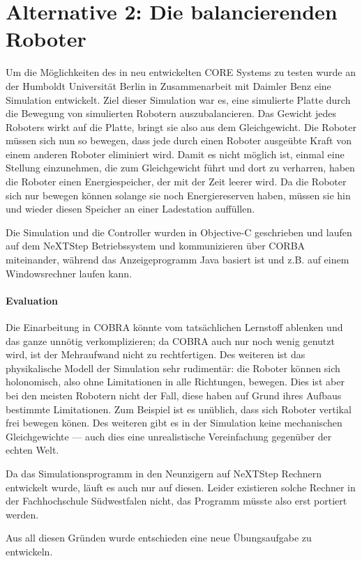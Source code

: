 \clearpage
\section{Alternative 2: Die balancierenden Roboter}
Um die M{\"{o}}glichkeiten des in \cite{Werner00} neu entwickelten CORE Systems zu testen wurde an der Humboldt Universit{\"{a}}t Berlin in Zusammenarbeit
mit Daimler Benz eine Simulation entwickelt. Ziel dieser Simulation war es, eine simulierte Platte durch die Bewegung von simulierten
Robotern auszubalancieren. Das Gewicht jedes Roboters wirkt auf die Platte, bringt sie also aus dem Gleichgewicht. Die Roboter m{\"{u}}ssen sich nun so
bewegen, dass jede durch einen Roboter ausge{\"{u}}bte Kraft von einem anderen Roboter eliminiert wird. Damit es nicht m{\"{o}}glich ist, einmal eine Stellung einzunehmen,
die zum Gleichgewicht f{\"{u}}hrt und dort zu verharren, haben die Roboter einen Energiespeicher, der mit der Zeit leerer wird. Da die Roboter sich nur bewegen k{\"{o}}nnen
solange sie noch Energiereserven haben, m{\"{u}}ssen sie hin und wieder diesen Speicher an einer Ladestation auff{\"{u}}llen.

Die Simulation und die Controller wurden in Objective-C geschrieben und laufen auf dem NeXTStep Betriebssystem und kommunizieren {\"{u}}ber CORBA miteinander\cite{predictablecorba},
w{\"{a}}hrend das Anzeigeprogramm Java basiert ist und z.B. auf einem Windowsrechner laufen kann.

\paragraph{Evaluation} Die Einarbeitung in COBRA k{\"{o}}nnte vom tats{\"{a}}chlichen Lernstoff ablenken und das ganze unn{\"{o}}tig verkomplizieren; da COBRA auch nur noch
wenig genutzt wird, ist der Mehraufwand nicht zu rechtfertigen. Des weiteren ist das physikalische Modell der Simulation sehr rudiment{\"{a}}r:
die Roboter k{\"{o}}nnen sich holonomisch, also ohne Limitationen in alle Richtungen, bewegen. Dies ist aber bei den meisten Robotern nicht
der Fall, diese haben auf Grund ihres Aufbaus bestimmte Limitationen. Zum Beispiel ist es un{\"{u}}blich, dass sich Roboter vertikal frei bewegen k{\"{o}}nen. Des weiteren
gibt es in der Simulation keine mechanischen Gleichgewichte --- auch dies eine unrealistische Vereinfachung gegen{\"{u}}ber der echten Welt.

Da das Simulationsprogramm in den Neunzigern auf NeXTStep Rechnern entwickelt wurde, l{\"{a}}uft es auch nur auf diesen. Leider existieren solche Rechner in der Fachhochschule
S{\"{u}}dwestfalen nicht, das Programm m{\"{u}}sste also erst portiert werden.

Aus all diesen Gr{\"{u}}nden wurde entschieden eine neue {\"{U}}bungsaufgabe zu entwickeln.
